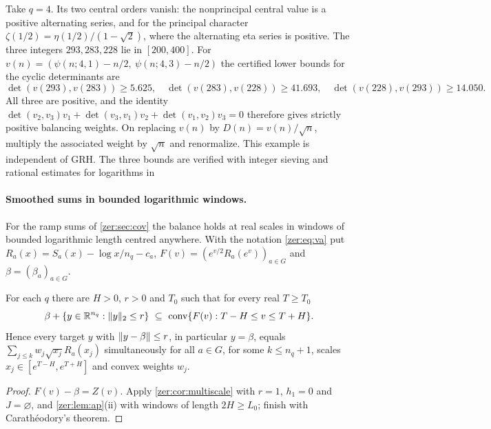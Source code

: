 \begin{example}[\stU]\label{zer:ex:triangle}
Take $q=4$. Its two central orders vanish: the nonprincipal central value is a positive
alternating series, and for the principal character $\zeta(1/2)=\eta(1/2)/(1-\sqrt2)$,
where the alternating eta series is positive. The three integers $293,283,228$ lie in
$[200,400]$. For $v(n)=(\psi(n;4,1)-n/2,\ \psi(n;4,3)-n/2)$ the certified lower bounds for
the cyclic determinants are
\[
 \det(v(293),v(283))\ge5.625,\quad\det(v(283),v(228))\ge41.693,\quad
 \det(v(228),v(293))\ge14.050 .
\]
All three are positive, and the identity
$\det(v_2,v_3)v_1+\det(v_3,v_1)v_2+\det(v_1,v_2)v_3=0$ therefore gives strictly positive
balancing weights. On replacing $v(n)$ by $D(n)=v(n)/\sqrt n$, multiply the associated
weight by $\sqrt n$ and renormalize. This example is independent of GRH. The three bounds
are verified with integer sieving and rational estimates for logarithms in
\begin{center}
\end{center}
\end{example}

\paragraph{Smoothed sums in bounded logarithmic windows.}
For the ramp sums of \cref{zer:sec:cov} the balance holds at real scales in windows of bounded
logarithmic length centred anywhere. With the notation \eqref{zer:eq:va} put
$R_a(x)=S_a(x)-\log x/n_q-c_a$, $F(v)=(e^{v/2}R_a(e^v))_{a\in G}$ and $\beta=(\beta_a)_{a\in G}$.

\begin{corollary}\label{zer:cor:smoothbalance}
For each $q$ there are $H>0$, $r>0$ and $T_0$ such that for every real $T\ge T_0$
\[
 \beta+\set{y\in\R^{n_q}:\norm y_2\le r}\ \subseteq\ \zerconv\set{F(v):T-H\le v\le T+H}.
\]
Hence every target $y$ with $\lVert y-\beta\rVert\le r$, in particular $y=\beta$, equals
$\sum_{j\le k}w_j\sqrt{x_j}R_a(x_j)$ simultaneously for all $a\in G$, for some $k\le n_q+1$,
scales $x_j\in[e^{T-H},e^{T+H}]$ and convex weights $w_j$.
\end{corollary}
\begin{proof}
$F(v)-\beta=Z(v)$. Apply \cref{zer:cor:multiscale} with $r=1$, $h_1=0$ and $J=\varnothing$,
and \cref{zer:lem:ap}(ii) with windows of length $2H\ge L_0$; finish with Carath\'eodory's
theorem.
\end{proof}

